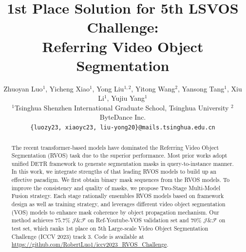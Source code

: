 \documentclass[10pt,twocolumn,letterpaper]{article}
\begin{document}
\title{1st Place Solution for 5th LSVOS Challenge: \\ Referring Video Object Segmentation}
\author{Zhuoyan Luo$^{1}$\footnotemark[2], Yicheng Xiao$^{1}$\footnotemark[2], Yong Liu$^{1,2}$\footnotemark[2]\footnotemark[3], Yitong Wang$^{2}$, Yansong Tang$^{1}$, Xiu Li$^{1}$, Yujiu Yang$^{1}$\\
\small $^1$Tsinghua Shenzhen International Graduate School, Tsinghua University  $^2$ByteDance Inc. \\
{\tt\small \{luozy23, xiaoyc23, liu-yong20\}@mails.tsinghua.edu.cn} \\
}
\maketitle
\thispagestyle{empty}
\renewcommand{\thefootnote}{\fnsymbol{footnote}}


\begin{abstract}
The recent transformer-based models have dominated the Referring Video Object Segmentation (RVOS) task due to the superior performance. Most prior works adopt unified DETR framework to generate segmentation masks in query-to-instance manner. In this work, we integrate strengths of that leading RVOS models to build up an effective paradigm. We first obtain binary mask sequences from the RVOS models. To improve the consistency and quality of masks, we propose Two-Stage Multi-Model Fusion strategy. Each stage rationally ensembles RVOS models based on framework design as well as training strategy, and leverages different video object segmentation (VOS) models to enhance mask coherence by object propagation mechanism. Our method achieves $75.7\%$ $\mathcal{J} \& \mathcal{F}$ on Ref-Youtube-VOS validation set and %
$70\%$ $\mathcal{J} \& \mathcal{F}$ on test set, which ranks 1st place on 5th Large-scale Video Object Segmentation Challenge (ICCV 2023) track 3. Code is available at \href{https://github.com/RobertLuo1/iccv2023_RVOS_Challenge}{https://github.com/RobertLuo1/iccv2023\_RVOS\_Challenge}.
\end{abstract}
\vspace{-10pt}
\end{document}
